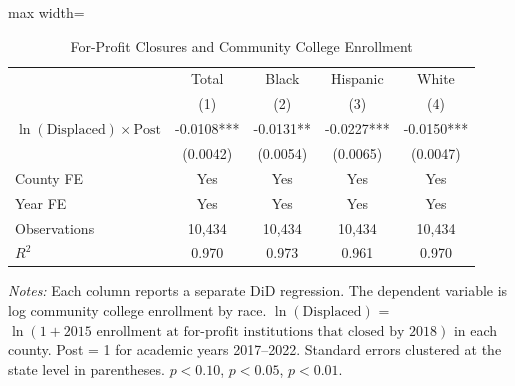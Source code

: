 \begin{table}[htbp]
\centering
\caption{For-Profit Closures and Community College Enrollment}
\label{tab:main}
\begin{threeparttable}
\begin{adjustbox}{max width=\textwidth}
\begin{tabular}{l cccc}
\toprule
 & Total & Black & Hispanic & White \\
 & (1) & (2) & (3) & (4) \\
\midrule
$\ln(\text{Displaced}) \times \text{Post}$ & -0.0108*** & -0.0131** & -0.0227*** & -0.0150*** \\
 & (0.0042) & (0.0054) & (0.0065) & (0.0047) \\
\midrule
County FE & Yes & Yes & Yes & Yes \\
Year FE & Yes & Yes & Yes & Yes \\
Observations & 10,434 & 10,434 & 10,434 & 10,434 \\
$R^2$ & 0.970 & 0.973 & 0.961 & 0.970 \\
\bottomrule
\end{tabular}
\end{adjustbox}
\begin{tablenotes}[flushleft]
\small
\item \textit{Notes:} Each column reports a separate DiD regression. The dependent variable is log community college enrollment by race. $\ln(\text{Displaced})$ = $\ln(1 + \text{2015 enrollment at for-profit institutions that closed by 2018})$ in each county. Post = 1 for academic years 2017--2022. Standard errors clustered at the state level in parentheses. \sym{*} $p<0.10$, \sym{**} $p<0.05$, \sym{***} $p<0.01$.
\end{tablenotes}
\end{threeparttable}
\end{table}

